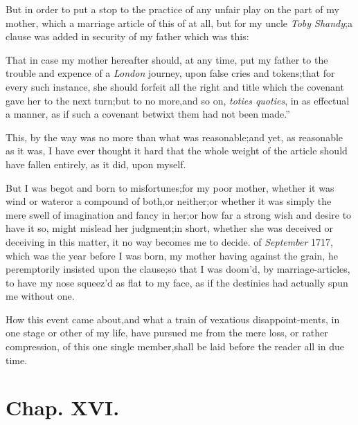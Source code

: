 \documentclass{article}
\begin{document}
But in order to put a stop to the practice of any unfair play on
the part of my mother, which a marriage article of this\pb
{} 
of at all, but for my uncle \textit{Toby Shandy};\tsk\break  a
clause was added in security of my father which was this:\tsk 
\begin{story}{That in case my}
mother hereafter should, at any time, put my father to the
trouble and expence of a \textit{London} journey, upon false cries
and tokens;\tsh  that for every such instance, she should
forfeit all the right and title which the covenant gave her to the
next turn;\tsh  but to no more,\tsk  and so on, \textit{toties
quoties}, in as effectual a manner, as if such a covenant
betwixt them had not been made.” \tsh
\end{story}

\noindent
This, by the way was
no more than what was reasonable;\tsk  and yet, as reasonable as
it was, I have ever thought it hard that the whole weight of the
article should have fallen entirely, as it did, upon myself.

\newpage
But I was begot and born to misfortunes;\tsk  for my poor mother, whether it was
wind or water\tsk  or a compound of both,\tsk  or neither;\tsk  or whether it was
simply the mere swell of imagination and fancy in her;\tsk  or how far a strong wish
and desire to have it so, might mislead her judgment;\tsk  in short, whether she was
deceived or deceiving in this matter, it no way becomes me to decide.\break
{} of \textit{September} 1717, which was the year before I
was born, my mother having\break
{}
against the grain,\tsk
he peremptorily insisted upon the clause;\tsk  so that I was doom’d, by
marriage-articles, to have my nose squeez’d as flat to my face, as if the destinies
had actually spun me without one.

\newpage
How this event came about,\tsk  and what a train of vexatious
disappoint-\break ments, in one stage or other of my life, have pursued me
from the mere loss, or rather compression, of this one single
member,\tsk  shall be laid before the reader all in due time.

\section{Chap. XVI.}
\end{document}
